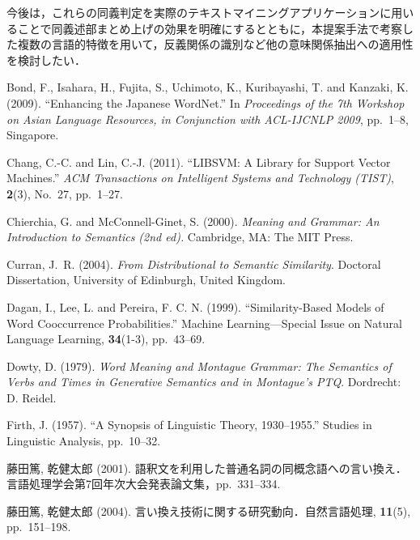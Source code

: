\documentclass[japanese]{jnlp_1.4}
\begin{document}
今後は，これらの同義判定を実際のテキストマイニングアプリケーションに用いることで同義述部まとめ上げの効果を明確にするとともに，本提案手法で考察した複数の言語的特徴を用いて，反義関係の識別など他の意味関係抽出への適用性を検討したい．




\begin{thebibliography}{}
\item
Bond, F., Isahara, H., Fujita, S., Uchimoto, K., Kuribayashi, T. and Kanzaki, K. (2009). ``Enhancing the Japanese WordNet.'' In \textit{Proceedings of the 7th Workshop on Asian Language Resources, in Conjunction with ACL-IJCNLP 2009}, pp.~1--8, Singapore.

\item
Chang, C.-C. and Lin, C.-J. (2011). ``LIBSVM: A Library for Support Vector 
Machines.'' \textit{ACM Transactions on Intelligent Systems and Technology (TIST)}, \textbf{2}(3), No.~27, pp.~1--27.

\item
Chierchia, G. and McConnell-Ginet, S. (2000). \textit{Meaning and Grammar: An Introduction to Semantics (2nd ed).} Cambridge, MA: The MIT Press.

\item
Curran, J.~R. (2004). \textit{From Distributional to Semantic Similarity}. Doctoral Dissertation, University of Edinburgh, 
United Kingdom.

\item
Dagan, I., Lee, L. and Pereira, F. C. N. (1999). ``Similarity-Based Models 
of Word Cooccurrence Probabilities.'' Machine Learning---Special Issue on 
Natural Language Learning, \textbf{34}(1-3), pp.~43--69.

\item
Dowty, D. (1979). \textit{Word Meaning and Montague Grammar: The Semantics of Verbs and Times in Generative Semantics and in Montague's PTQ}. Dordrecht: D. Reidel.

\item
Firth, J. (1957). ``A Synopsis of Linguistic Theory, 1930--1955.'' Studies in 
Linguistic Analysis, pp.~10--32.

\item
藤田篤, 乾健太郎 (2001). 
語釈文を利用した普通名詞の同概念語への言い換え．言語処理学会第7回年次大会発表論文集，pp.~331--334.

\item
藤田篤, 乾健太郎 (2004). 言い換え技術に関する研究動向．自然言語処理, 
\textbf{11}(5), pp.~151--198.


\end{thebibliography}
\end{document}
